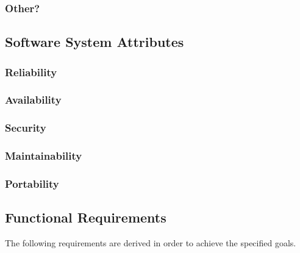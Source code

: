 \subsubsection{Other?}

\subsection{Software System Attributes}

\subsubsection{Reliability}
\subsubsection{Availability}
\subsubsection{Security}
\subsubsection{Maintainability}
\subsubsection{Portability}





\subsection{Functional Requirements}
The following requirements are derived in order to achieve the specified goals.
